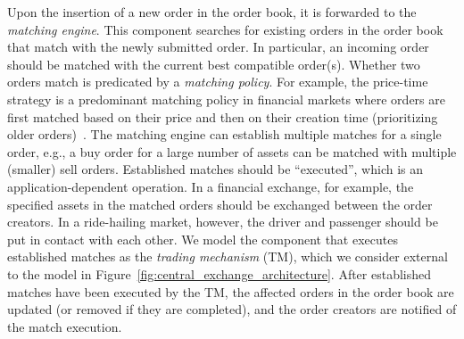 Upon the insertion of a new order in the order book, it is forwarded to the \emph{matching engine}.
This component searches for existing orders in the order book that match with the newly submitted order.
In particular, an incoming order should be matched with the current best compatible order(s).
Whether two orders match is predicated by a \emph{matching policy}.
For example, the price-time strategy is a predominant matching policy in financial markets where orders are first matched based on their price and then on their creation time (prioritizing older orders)~\cite{mavroudis2019libra}.
The matching engine can establish multiple matches for a single order, e.g., a buy order for a large number of assets can be matched with multiple (smaller) sell orders.
Established matches should be \enquote{executed}, which is an application-dependent operation.
In a financial exchange, for example, the specified assets in the matched orders should be exchanged between the order creators.
In a ride-hailing market, however, the driver and passenger should be put in contact with each other.
We model the component that executes established matches as the \emph{trading mechanism} (TM), which we consider external to the model in Figure~\ref{fig:central_exchange_architecture}.
After established matches have been executed by the TM, the affected orders in the order book are updated (or removed if they are completed), and the order creators are notified of the match execution.

